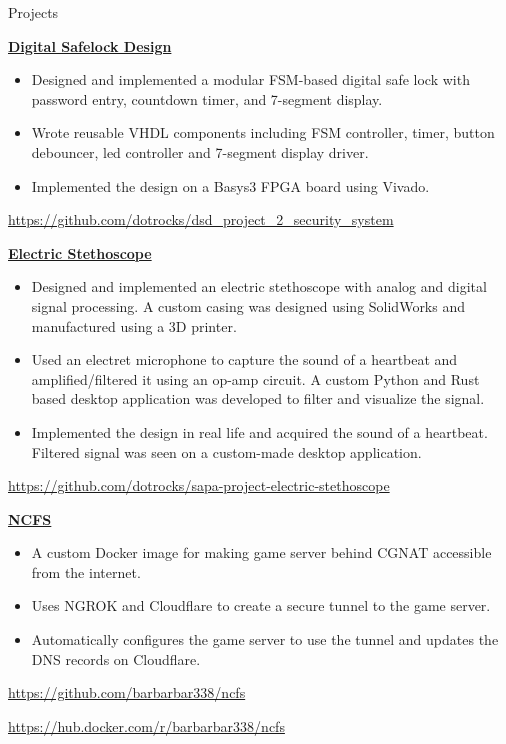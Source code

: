 \begin{rubric}{Projects}

    \entry*[2025]%
        \href{https://github.com/dotrocks/dsd_project_2_security_system}{\textbf{Digital Safelock Design}}
        \begin{itemize}
            \item Designed and implemented a modular FSM-based digital safe lock with password entry, countdown timer, and 7-segment display.
            \item Wrote reusable VHDL components including FSM controller, timer, button debouncer, led controller and 7-segment display driver.
            \item Implemented the design on a Basys3 FPGA board using Vivado.
        \end{itemize}
        \par \url{https://github.com/dotrocks/dsd_project_2_security_system}
    
    \entry*[2024]%
        \href{https://github.com/dotrocks/sapa-project-electric-stethoscope}{\textbf{Electric Stethoscope}}
        \begin{itemize}
            \item Designed and implemented an electric stethoscope with analog and digital signal processing. A custom casing was designed using SolidWorks and manufactured using a 3D printer.
            \item Used an electret microphone to capture the sound of a heartbeat and amplified/filtered it using an op-amp circuit. A custom Python and Rust based desktop application was developed to filter and visualize the signal.
            \item Implemented the design in real life and acquired the sound of a heartbeat. Filtered signal was seen on a custom-made desktop application.
        \end{itemize}
        \par \url{https://github.com/dotrocks/sapa-project-electric-stethoscope}


    \entry*[2023]%
        \href{https://github.com/barbarbar338/ncfs}{\textbf{NCFS}}
        \begin{itemize}
            \item A custom Docker image for making game server behind CGNAT accessible from the internet.
            \item Uses NGROK and Cloudflare to create a secure tunnel to the game server.
            \item Automatically configures the game server to use the tunnel and updates the DNS records on Cloudflare.
        \end{itemize}
        \par \url{https://github.com/barbarbar338/ncfs}
        \par \url{https://hub.docker.com/r/barbarbar338/ncfs}


\end{rubric}
